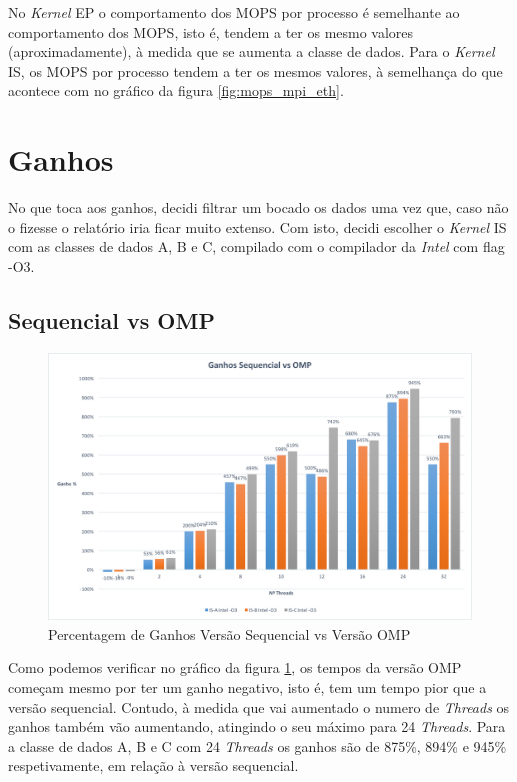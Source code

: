 \documentclass[conference,compsoc]{IEEEtran}
\begin{document}
No \textit{Kernel} EP o comportamento dos MOPS por processo é semelhante ao comportamento dos MOPS, isto é, tendem a ter os mesmo valores (aproximadamente), à medida que se aumenta a classe de dados. Para o \textit{Kernel} IS, os MOPS por processo tendem a ter os mesmos valores, à semelhança do que acontece com no gráfico da figura \ref{fig:mops_mpi_eth}.

\section{Ganhos}
No que toca aos ganhos, decidi filtrar um bocado os dados uma vez que, caso não o fizesse o relatório iria ficar muito extenso. Com isto, decidi escolher o \textit{Kernel} IS com as classes de dados A, B e C, compilado com o compilador da \textit{Intel} com flag -O3.

\subsection{Sequencial vs OMP}

\begin{figure}[h!]
\centering
\includegraphics[scale=0.325]{ganhos_seq_vs_omp.png}
\caption{Percentagem de Ganhos Versão Sequencial vs Versão OMP}
\label{fig:ganhos_seq_vs_omp}
\end{figure}

Como podemos verificar no gráfico da figura \ref{fig:ganhos_seq_vs_omp}, os tempos da versão OMP começam mesmo por ter um ganho negativo, isto é, tem um tempo pior que a versão sequencial. Contudo, à medida que vai aumentado o numero de \textit{Threads} os ganhos também vão aumentando, atingindo o seu máximo para 24 \textit{Threads}. Para a classe de dados A, B e C com 24 \textit{Threads} os ganhos são de 875\%, 894\% e 945\% respetivamente, em relação à versão sequencial.
\end{document}
